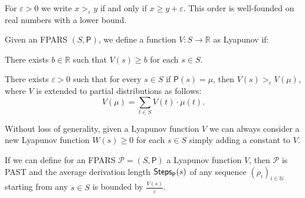 \begin{notation}
	For $\varepsilon>0$ we write $x>_{\varepsilon}y$ if and only if $x\geq y+\varepsilon$. This order is well-founded on real numbers with a lower bound.
\end{notation}
\begin{definition}
	Given an FPARS $\left( S,\mathsf{P}\right)$, we define a function $V:S\rightarrow\mathbb{R}$ as Lyapunov if:
	\begin{varitemize}
		\item
		There exists $b\in\mathbb{R}$ such that $V\left(s\right)\geq b$ for each $s\in S$.
		\item
		There exists $\varepsilon>0$ such that for every $s\in S$ if $\mathsf{P}\left(s\right) = \mu$, then $V\left(s\right) >_{\varepsilon} V\left(\mu\right)$, where $V$ is extended to partial distributions as follows:
		$$
		V\left(\mu\right)=\sum_{t\in S}V\left(t\right)\cdot\mu\left(t\right).
		$$
	\end{varitemize}
\end{definition}
\begin{remark}
	Without loss of generality, given a Lyapunov function $V$ we can always consider a new Lyapunov function $W(s)\geq 0$ for each $s\in S$ simply adding a constant to $V$.
\end{remark}
\begin{theorem}
	If we can define for an FPARS $\mathcal{P}=\left(S,\mathsf{P}\right)$ a Lyapunov function $V$, then $\mathcal{P}$ is PAST and the average derivation length $\textsf{Steps}_{\mathsf{P}}(s)$ of any sequence $(\rho_i)_{i\in\mathbb{N}}$ starting from any $s\in S$ is bounded by
	$\frac{V\left(s\right)}{\varepsilon}$.
\end{theorem}
